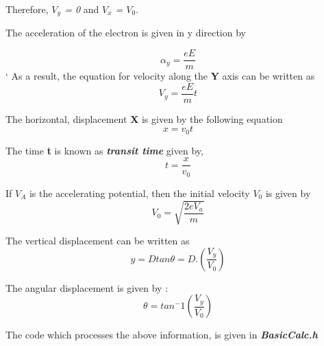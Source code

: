 \documentclass[a4paper,20pt,twoside]{report}
\begin{document}
	Therefore, \textit{$V_y$ = 0} and \textit{$V_x$ = $V_0$}.
	
	The  acceleration of the electron is given in y direction by 
	
	\begin{equation}
	\alpha_y = \frac{eE}{m}
	\end{equation}
	`
	As a result, the equation for velocity along the \textbf{Y} axis can be written as
	\begin{equation}
	V_y = \frac{eE}{m}t
	\end{equation}
	
	The horizontal, displacement \textbf{X} is given by the following equation
	\begin{equation}
		x = v_0t
	\end{equation}
	
	The time \textbf{t} is known as \textit{\textbf{transit time}} given by,
	\begin{equation}
	t = \frac{x}{v_0}
	\end{equation}
	
	If \textbf{$V_A$} is the accelerating potential, then the initial velocity $V_0$ is given by
	\begin{equation}
	V_0 = \sqrt{\frac{2eV_a}{m}}
	\end{equation}
	
	The vertical displacement can be written as 
	\begin{equation}
	y = Dtan\theta = D.\left({\frac{V_y}{V_0}}\right)
	\end{equation}
	
	The angular displacement is given by : 
	\begin{equation}
	\theta = tan^-1\left(\frac{V_y}{V_0}\right)
	\end{equation}
	
	
	The code which processes the above information, is given in \textit{\textbf{BasicCalc.h}}
	

	\vspace{10mm}
	
\end{document}

